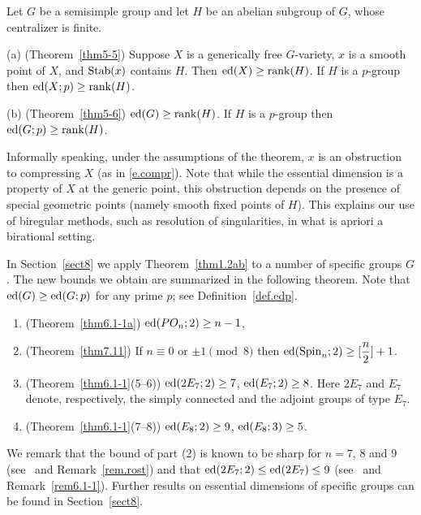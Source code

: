 \begin{thm} \label{thm1.2ab} 
Let $G$ be a semisimple group and let $H$ be an 
abelian subgroup of $G$, whose centralizer is finite.

\smallskip
(a) (Theorem~\ref{thm5-5}) Suppose
$X$ is a generically free $G$-variety, $x$ is a smooth point of 
$X$, and $\operatorname{Stab}(x)$ contains $H$. Then $\operatorname{ed}(X) \geq \operatorname{rank}(H)$. 
If $H$ is a $p$-group then $\operatorname{ed}(X; p) \geq \operatorname{rank}(H)$. 

\smallskip
(b) (Theorem~\ref{thm5-6}) $\operatorname{ed}(G) \geq \operatorname{rank}(H)$. If $H$ is a $p$-group
then $\operatorname{ed}(G; p) \geq \operatorname{rank}(H)$.
\end{thm}

Informally speaking, under the assumptions of the theorem,
$x$ is an obstruction to compressing $X$ 
(as in \eqref{e.compr}).  Note that while the essential dimension
is a property of $X$ at the generic point, this obstruction depends 
on the presence of 
special geometric points (namely smooth fixed points of $H$).
This explains our use of biregular methods, such as resolution 
of singularities, in what is apriori a birational setting.

In Section~\ref{sect8} we apply Theorem~\ref{thm1.2ab} to a number of specific
groups $G$. The new bounds we obtain are summarized in the following theorem.
Note that $\operatorname{ed}(G) \geq \operatorname{ed}(G; p)$ for any prime $p$; 
see Definition~\ref{def.edp}. 

\begin{thm} \label{thm1.2cd}
\begin{enumerate}
\item (Theorem~\ref{thm6.1-1a}) $\operatorname{ed}(PO_n; 2) \geq n-1$,

\item (Theorem~\ref{thm7.11}) If $n \equiv 0$ or $\pm 1 \pmod 8$ then
$\operatorname{ed}(\operatorname{Spin}_n; 2) \geq [\dfrac{n}{2}]+1$.

\item
(Theorem~\ref{thm6.1-1}(5--6)) 
$\operatorname{ed}(2E_7; 2) \geq 7$, $\operatorname{ed}(E_7; 2) \geq 8$.
Here $2E_7$ and $E_7$ denote, respectively, the simply connected 
and the adjoint groups of type $E_7$.

\item (Theorem~\ref{thm6.1-1}(7--8)) 
$\operatorname{ed}(E_8; 2) \geq 9$, $\operatorname{ed}(E_8; 3) \geq 5$.
\end{enumerate}
\end{thm} 

We remark that the bound of part (2) is known to be sharp for 
$n = 7$, $8$ and $9$ (see~\cite{rostspin} and Remark~\ref{rem.rost})
and that $\operatorname{ed}(2E_7; 2) \leq \operatorname{ed}(2E_7) \leq 9$ (see~\cite{kordonsky}
and Remark~\ref{rem6.1-1}).  Further results on essential
dimensions of specific groups can be found in Section~\ref{sect8}.

